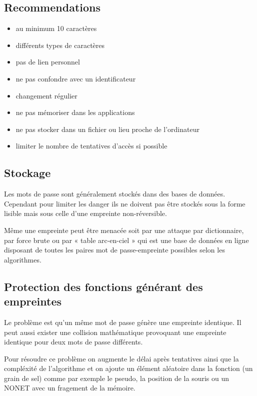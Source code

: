 \documentclass[12pt, a4paper]{article}
\begin{document}
	\subsection{Recommendations}
	\begin{itemize}
		\item au minimum 10 caractères
		\item différents types de caractères
		\item pas de lien personnel
		\item ne pas confondre avec un identificateur
		\item changement régulier
		\item ne pas mémoriser dans les applications
		\item ne pas stocker dans un fichier ou lieu proche de l'ordinateur
		\item limiter le nombre de tentatives d'accès si possible
	\end{itemize}
	\subsection{Stockage}
	Les mots de passe sont généralement stockés dans des bases de données.
	Cependant pour limiter les danger ils ne doivent pas être stockés sous la
	forme lisible mais sous celle d'une empreinte non-réversible.
	\par
	Même une empreinte peut être menacée soit par une attaque par dictionnaire,
	par force brute ou par « table arc-en-ciel » qui est une base de données en
	ligne disposant de toutes les paires mot de passe-empreinte possibles selon
	les algorithmes.
	\subsection{Protection des fonctions générant des empreintes}
	Le problème est qu'un même mot de passe génère une empreinte identique. Il
	peut aussi exister une collision mathématique provoquant une empreinte
	identique pour deux mots de passe différents.
	\par
	Pour résoudre ce problème on augmente le délai après tentatives ainsi que la
	compléxité de l'algorithme et on ajoute un élément aléatoire dans la fonction
	(un grain de sel) comme par exemple le pseudo, la position de la souris ou un
	NONET avec un fragement de la mémoire.
\end{document}
